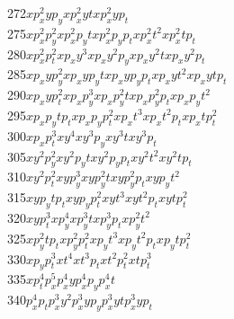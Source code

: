 \begin{tabbing}
272\>$x  p_x^2 y  p_y   $\>$x  p_x^2 y  t     $\>$x  p_x^2 y  p_t   $\\
275\>$x  p_x^2 p_y^2    $\>$x  p_x^2 p_yt     $\>$x  p_x^2 p_yp_t   $\>$x  p_x^2 t  ^2    $\>$x  p_x^2 t  p_t   $\\
280\>$x  p_x^2 p_t^2    $\>$x  p_xy  ^3       $\>$x  p_xy  ^2 p_y   $\>$x  p_xy  ^2 t     $\>$x  p_xy  ^2 p_t   $\\
285\>$x  p_xy  p_y^2    $\>$x  p_xy  p_yt     $\>$x  p_xy  p_yp_t   $\>$x  p_xy  t  ^2    $\>$x  p_xy  t  p_t   $\\
290\>$x  p_xy  p_t^2    $\>$x  p_xp_y^3       $\>$x  p_xp_y^2 t     $\>$x  p_xp_y^2 p_t   $\>$x  p_xp_yt  ^2    $\\
295\>$x  p_xp_yt  p_t   $\>$x  p_xp_yp_t^2    $\>$x  p_xt  ^3       $\>$x  p_xt  ^2 p_t   $\>$x  p_xt  p_t^2    $\\
300\>$x  p_xp_t^3       $\>$x  y  ^4          $\>$x  y  ^3 p_y      $\>$x  y  ^3 t        $\>$x  y  ^3 p_t      $\\
305\>$x  y  ^2 p_y^2    $\>$x  y  ^2 p_yt     $\>$x  y  ^2 p_yp_t   $\>$x  y  ^2 t  ^2    $\>$x  y  ^2 t  p_t   $\\
310\>$x  y  ^2 p_t^2    $\>$x  y  p_y^3       $\>$x  y  p_y^2 t     $\>$x  y  p_y^2 p_t   $\>$x  y  p_yt  ^2    $\\
315\>$x  y  p_yt  p_t   $\>$x  y  p_yp_t^2    $\>$x  y  t  ^3       $\>$x  y  t  ^2 p_t   $\>$x  y  t  p_t^2    $\\
320\>$x  y  p_t^3       $\>$x  p_y^4          $\>$x  p_y^3 t        $\>$x  p_y^3 p_t      $\>$x  p_y^2 t  ^2    $\\
325\>$x  p_y^2 t  p_t   $\>$x  p_y^2 p_t^2    $\>$x  p_yt  ^3       $\>$x  p_yt  ^2 p_t   $\>$x  p_yt  p_t^2    $\\
330\>$x  p_yp_t^3       $\>$x  t  ^4          $\>$x  t  ^3 p_t      $\>$x  t  ^2 p_t^2    $\>$x  t  p_t^3       $\\
335\>$x  p_t^4          $\>$p_x^5             $\>$p_x^4 y           $\>$p_x^4 p_y         $\>$p_x^4 t           $\\
340\>$p_x^4 p_t         $\>$p_x^3 y  ^2       $\>$p_x^3 y  p_y      $\>$p_x^3 y  t        $\>$p_x^3 y  p_t      $\\

\end{tabbing}

